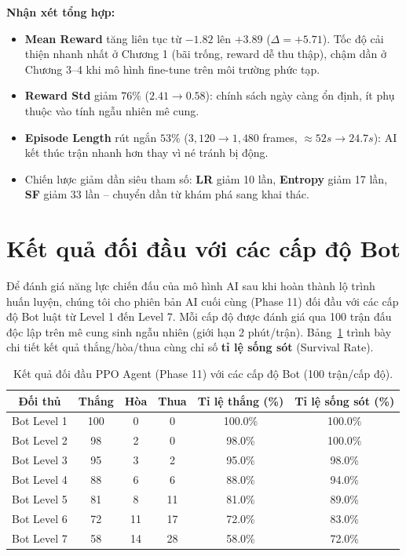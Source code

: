 \documentclass[a4paper, 12pt]{report}
\begin{document}
  \textbf{Nhận xét tổng hợp:}
  \begin{itemize}
    \item \textbf{Mean Reward} tăng liên tục từ $-1.82$ lên $+3.89$ ($\Delta = +5.71$). Tốc độ cải thiện nhanh nhất ở Chương 1 (bãi trống, reward dễ thu thập), chậm dần ở Chương 3--4 khi mô hình fine-tune trên môi trường phức tạp.
    \item \textbf{Reward Std} giảm $76\%$ ($2.41 \to 0.58$): chính sách ngày càng ổn định, ít phụ thuộc vào tính ngẫu nhiên mê cung.
    \item \textbf{Episode Length} rút ngắn $53\%$ ($3{,}120 \to 1{,}480$ frames, $\approx 52s \to 24.7s$): AI kết thúc trận nhanh hơn thay vì né tránh bị động.
    \item Chiến lược giảm dần siêu tham số: \textbf{LR} giảm 10 lần, \textbf{Entropy} giảm 17 lần, \textbf{SF} giảm 33 lần -- chuyển dần từ khám phá sang khai thác.
  \end{itemize}

  \section{Kết quả đối đầu với các cấp độ Bot}

  Để đánh giá năng lực chiến đấu của mô hình AI sau khi hoàn thành lộ trình huấn luyện, chúng tôi cho phiên bản AI cuối cùng (Phase 11) đối đầu với các cấp độ Bot luật từ Level 1 đến Level 7. Mỗi cấp độ được đánh giá qua 100 trận đấu độc lập trên mê cung sinh ngẫu nhiên (giới hạn 2 phút/trận). Bảng~\ref{tab:survival_results} trình bày chi tiết kết quả thắng/hòa/thua cùng chỉ số \textbf{tỉ lệ sống sót} (Survival Rate).

  \begin{table}[H]
  \centering
  \caption{Kết quả đối đầu PPO Agent (Phase 11) với các cấp độ Bot (100 trận/cấp độ).}
  \label{tab:survival_results}
  \renewcommand{\arraystretch}{1.2}
  \small
  \begin{tabular}{c c c c c c}
    \toprule
    \textbf{Đối thủ} & \textbf{Thắng} & \textbf{Hòa} & \textbf{Thua} & \textbf{Tỉ lệ thắng (\%)} & \textbf{Tỉ lệ sống sót (\%)} \\
    \midrule
    Bot Level 1 & 100 & 0  & 0  & 100.0\% & 100.0\% \\
    Bot Level 2 & 98  & 2  & 0  & 98.0\%  & 100.0\% \\
    Bot Level 3 & 95  & 3  & 2  & 95.0\%  & 98.0\%  \\
    Bot Level 4 & 88  & 6  & 6  & 88.0\%  & 94.0\%  \\
    Bot Level 5 & 81  & 8  & 11 & 81.0\%  & 89.0\%  \\
    Bot Level 6 & 72  & 11 & 17 & 72.0\%  & 83.0\%  \\
    Bot Level 7 & 58  & 14 & 28 & 58.0\%  & 72.0\%  \\
    \bottomrule
  \end{tabular}
  \end{table}
\end{document}
